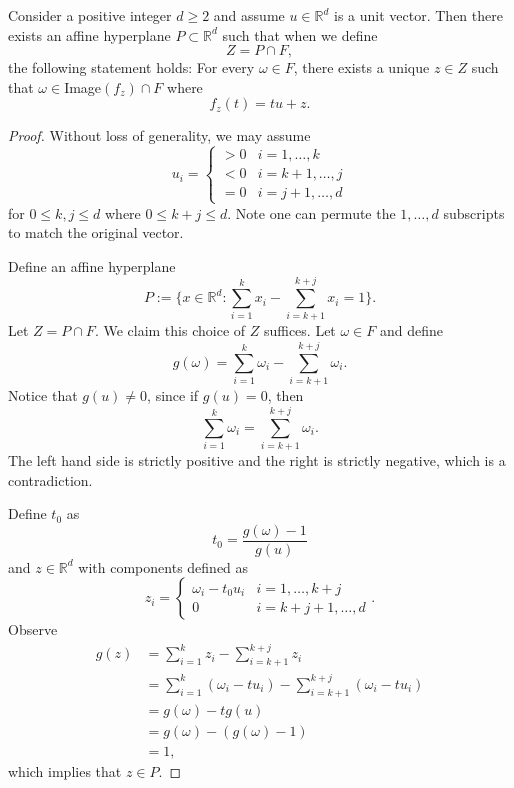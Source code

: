 \documentclass[10pt,a4paper]{amsart}
\newcommand{\RR}{\mathbb{R}}
\begin{document}
\begin{lemma}\label{l.hyperplane}
    Consider a positive integer $d\geq 2$ and assume $u\in\RR^d$ is a unit vector. Then there exists an affine hyperplane $P\subset \RR^d$ such that when we define
    \[Z = P \cap F,\]
    the following statement holds: For every $\omega\in F$, there exists a unique $z\in Z$ such that $\omega\in $Image$(f_z)\cap F$ where
    \[f_z(t) = tu + z.\]
\end{lemma}

\begin{proof}
    Without loss of generality, we may assume
    \[u_i = \begin{cases}
        > 0 & i = 1,\dots, k\\
        < 0 & i = k+1, \dots, j\\
        = 0 & i = j+1, \dots, d
    \end{cases}\]
    for $0\leq k,j\leq d$ where $0\leq k + j \leq d$. Note one can permute the $1,\dots, d$ subscripts to match the original vector. 

    Define an affine hyperplane 
    \[P:= \{x\in \RR^d: \sum_{i=1}^k x_i - \sum_{i=k+1}^{k+j} x_i = 1\}.\]
    Let $Z = P\cap F$. We claim this choice of $Z$ suffices. Let $\omega\in F$ and define
    \[g(\omega)= \sum_{i=1}^k \omega_i - \sum_{i=k+1}^{k+j} \omega_i.\]
    Notice that $g(u) \neq 0$, since if $g(u) = 0$, then 
    \[\sum_{i=1}^k \omega_i = \sum_{i=k+1}^{k+j} \omega_i.\]
    The left hand side is strictly positive and the right is strictly negative, which is a contradiction. 

    Define $t_0$ as
    \[t_0 = \frac{g(\omega) - 1}{g(u)}\]
    and $z \in \RR^d$ with components defined as
    \[z_i = \begin{cases}
        \omega_i -t_0u_i & i = 1,\dots, k+j\\
        0 & i = k+j + 1, \dots, d
    \end{cases}.\]
    Observe
    \begin{align*}
        g(z) &= \sum_{i=1}^k z_i - \sum_{i=k+1}^{k+j} z_i\\
        &= \sum_{i=1}^k (\omega_i -tu_i) - \sum_{i=k+1}^{k+j} (\omega_i -tu_i)\\
        &= g(\omega) - tg(u)\\
        &= g(\omega) - (g(\omega)-1)\\
        &= 1,
    \end{align*}
    which implies that $z\in P$. 
    

\end{proof}
\end{document}
